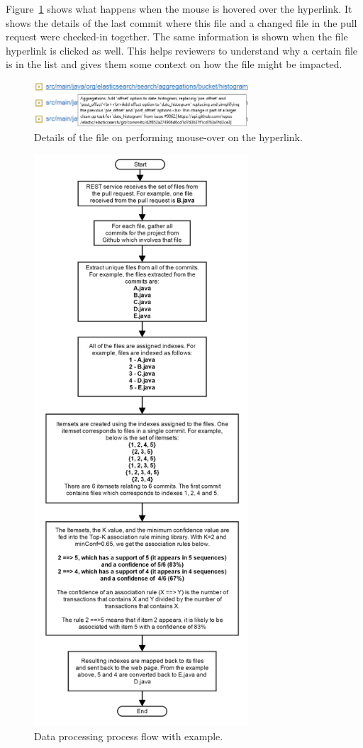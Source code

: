 Figure~\ref{fig:mouseOverOnFile} shows what happens when the mouse is hovered over the hyperlink. It shows the details of the last commit where this file and a changed file in the pull request were checked-in together. The same information is shown when the file hyperlink is clicked as well. This helps reviewers to understand why a certain file is in the list and gives them some context on how the file might be impacted.


\begin{figure}[ht!]
\centering
\includegraphics[width=8cm]{MouseOverOfFile}
\caption{Details of the file on performing mouse-over on the hyperlink.}
\label{fig:mouseOverOnFile}
\end{figure}

\begin{figure}[ht!]
\includegraphics[width=8cm]{data_processing_spmf}
\caption{Data processing process flow with example.}
\label{fig:data_processing_spmf}
\end{figure}

